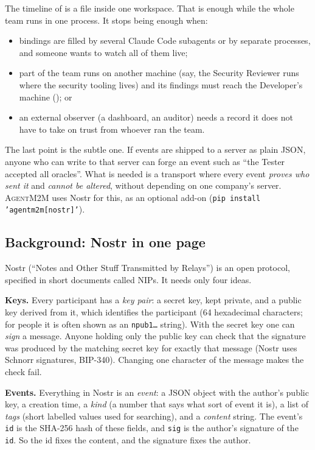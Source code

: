 \documentclass[10pt,a4paper]{article}
\newcommand{\tool}{\textsc{AgentM2M}}
\newcommand{\code}[1]{\texttt{#1}}
\theoremstyle{definition}
\newcommand{\what}[1]{\par\smallskip\noindent\textbf{#1}\quad}
\begin{document}
The timeline of  is a file inside one workspace. That is enough
while the whole team runs in one process. It stops being enough when:
\begin{itemize}[nosep]
\item bindings are filled by several Claude Code subagents or by separate
processes, and someone wants to watch all of them live;
\item part of the team runs on another machine (say, the Security Reviewer
runs where the security tooling lives) and its findings must reach the
Developer's machine (); or
\item an external observer (a dashboard, an auditor) needs a record it does
not have to take on trust from whoever ran the team.
\end{itemize}
\noindent The last point is the subtle one. If events are shipped to a
server as plain JSON, anyone who can write to that server can forge an event
such as ``the Tester accepted all oracles''. What is needed is a transport
where every event \emph{proves who sent it} and \emph{cannot be altered},
without depending on one company's server. \tool{} uses Nostr for this, as an
optional add-on (\code{pip install 'agentm2m[nostr]'}).

\subsection{Background: Nostr in one page}\label{sec:nostr-bg}

Nostr (``Notes and Other Stuff Transmitted by Relays'') is an open protocol,
specified in short documents called NIPs. It needs only four ideas.

\what{Keys.} Every participant has a \emph{key pair}: a secret key, kept
private, and a public key derived from it, which identifies the participant
(64 hexadecimal characters; for people it is often shown as an \code{npub1\ldots}
string). With the secret key one can \emph{sign} a message. Anyone holding
only the public key can check that the signature was produced by the matching
secret key for exactly that message (Nostr uses Schnorr signatures, BIP-340).
Changing one character of the message makes the check fail.

\what{Events.} Everything in Nostr is an \emph{event}: a JSON object with the
author's public key, a creation time, a \emph{kind} (a number that says what
sort of event it is), a list of \emph{tags} (short labelled values used for
searching), and a \emph{content} string. The event's \code{id} is the SHA-256
hash of these fields, and \code{sig} is the author's signature of the
\code{id}. So the id fixes the content, and the signature fixes the author.
\end{document}
